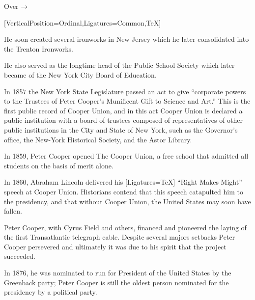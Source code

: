 \documentclass{article}
\begin{document}
\hfill Over { →}
%
\newpage{}
%
\begin{minipage}[t]{0.46\linewidth}
[VerticalPosition=Ordinal,Ligatures={Common,TeX}]
\fontsize{11pt}{13pt}\selectfont
\raggedright
\upshape
\begin{enumList}
\setcounter{enumListi}{\value{enumTemp}}

\item He soon created several ironworks in New Jersey which he later
consolidated into the { Trenton Ironworks}.

\item He also served as the longtime { head of the Public School Society} which later became of the New York City Board of Education.

\item In 1857 the New York State Legislature passed an act to give ``corporate
powers to the Trustees of Peter Cooper's Munificent Gift to Science and Art.''
This is the first public record of Cooper Union, and in this act Cooper Union is
declared a { public institution with a board of
trustees composed of representatives of other public institutions in the City and
State of New York}, such as the Governor's office, the New-York Historical
Society, and the Astor Library.

\item In 1859, Peter Cooper opened The Cooper Union, a {
free school that admitted all students on the basis of merit alone.}
\item In 1860, { Abraham Lincoln} delivered his
{[Ligatures=TeX] ``Right Makes Might''} speech at Cooper
Union.
Historians contend that this speech catapulted him to the presidency, and that
{ without Cooper Union, the United States may soon have
fallen.}

\item Peter Cooper, with Cyrus Field and others, financed and
pioneered the laying of the { first Transatlantic
telegraph cable}. Despite several majors setbacks Peter Cooper persevered and
ultimately it was due to his spirit that the project succeeded.

\item In 1876, he was { nominated to run for President of
the United States} by the Greenback party; Peter Cooper is still the
{ oldest person} nominated for the presidency by a political party.


\end{enumList}
\end{minipage}
\end{document}
